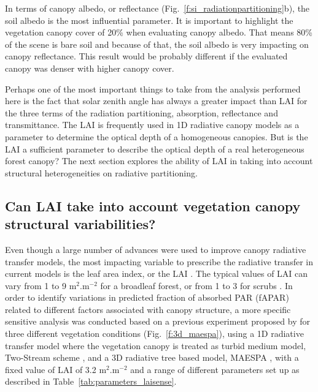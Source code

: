In terms of canopy albedo, or reflectance (Fig.~\ref{f:si_radiationpartitioning}b), the soil albedo is the most influential parameter. It is important to highlight the vegetation canopy cover of 20\% when evaluating canopy albedo. That means 80\% of the scene is bare soil and because of that, the soil albedo is very impacting on canopy reflectance. This result would be probably different if the evaluated canopy was denser with higher canopy cover.

Perhaps one of the most important things to take from the analysis performed here is the fact that solar zenith angle has always a greater impact than LAI for the three terms of the radiation partitioning, absorption, reflectance and transmittance. The LAI is frequently used in 1D radiative canopy models as a parameter to determine the optical depth of a homogeneous canopies. But is the LAI a sufficient parameter to describe the optical depth of a real heterogeneous forest canopy? The next section explores the ability of LAI in taking into account structural heterogeneities on radiative partitioning. 

\subsection{Can LAI take into account vegetation canopy structural variabilities?}
Even though a large number of advances were used to improve canopy radiative transfer models, the most impacting variable to prescribe the radiative transfer in current models is the leaf area index, or the LAI \citep{Yang2001}. The typical values of LAI can vary from 1 to 9 m$^2$.m$^{-2}$ for a broadleaf forest, or from 1 to 3 for scrubs \citep{Clark2011}. In order to identify variations in predicted fraction of absorbed PAR (fAPAR) related to different factors associated with canopy structure, a more specific sensitive analysis was conducted based on a previous experiment proposed by \citet{pinty2006} for three different vegetation conditions (Fig.~\ref{f:3d_maespa}), using a 1D radiative transfer model where the vegetation canopy is treated as turbid medium model, Two-Stream scheme \citep{Sellers1985}, and a 3D radiative tree based model, MAESPA \citep{Duursma2012}, with a fixed value of LAI of 3.2 m$^2$.m$^{-2}$ and a range of different parameters set up as described in Table~\ref{tab:parameters_laisense}.

